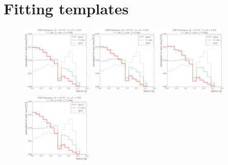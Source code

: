 \newpage



\chapter{Fitting templates}
\label{a:templates}


\centering
{}

\begin{figure}[!htbp]
	\centering
  	{\includegraphics[width=0.3\textwidth]{measurement/HT/central/fit_templates/electron_templates_bin_0-240}}
  	{\includegraphics[width=0.3\textwidth]{measurement/HT/central/fit_templates/electron_templates_bin_240-280}}
  	{\includegraphics[width=0.3\textwidth]{measurement/HT/central/fit_templates/electron_templates_bin_280-330}}\\
  	{\includegraphics[width=0.3\textwidth]{measurement/HT/central/fit_templates/electron_templates_bin_330-380}}

\end{figure}
